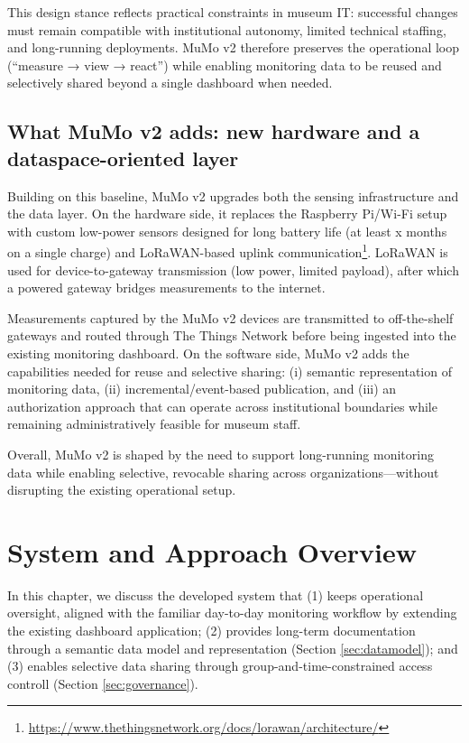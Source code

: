 This design stance reflects practical constraints in museum IT:
successful changes must remain compatible with institutional autonomy,
limited technical staffing, and long-running deployments. MuMo v2
therefore preserves the operational loop (``measure → view → react'')
while enabling monitoring data to be reused and selectively shared
beyond a single dashboard when needed.

\subsection{What MuMo v2 adds: new hardware and a dataspace-oriented
layer}\label{what-mumo-v2-adds-new-hardware-and-a-dataspace-oriented-layer}

Building on this baseline, MuMo v2 upgrades both the sensing
infrastructure and the data layer. On the hardware side, it replaces the
Raspberry Pi/Wi-Fi setup with custom low-power sensors designed for long
battery life (at least x months on a single charge) and LoRaWAN-based
uplink
communication\footnote{\url{https://www.thethingsnetwork.org/docs/lorawan/architecture/}}.
LoRaWAN is used for device-to-gateway transmission (low power, limited
payload), after which a powered gateway bridges measurements to the
internet.

Measurements captured by the MuMo v2 devices are transmitted to
off-the-shelf gateways and routed through The Things Network before
being ingested into the existing monitoring dashboard. On the software
side, MuMo v2 adds the capabilities needed for reuse and selective
sharing: (i) semantic representation of monitoring data, (ii)
incremental/event-based publication, and (iii) an authorization approach
that can operate across institutional boundaries while remaining
administratively feasible for museum staff.

Overall, MuMo v2 is shaped by the need to support long-running
monitoring data while enabling selective, revocable sharing across
organizations---without disrupting the existing operational setup.

\section{System and Approach Overview}\label{sec:approach}

In this chapter, we discuss the developed system that (1) keeps
operational oversight, aligned with the familiar day-to-day monitoring
workflow by extending the existing dashboard application; (2) provides
long-term documentation through a semantic data model and representation
(Section \ref{sec:datamodel}); and (3) enables selective data sharing
through group-and-time-constrained access controll (Section
\ref{sec:governance}).

